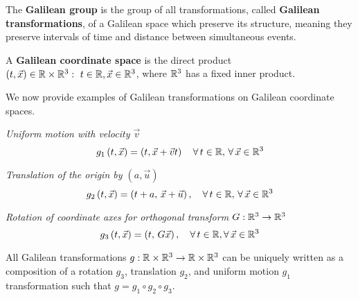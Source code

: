 \documentclass{article}
\begin{document}
		\begin{defn}
			The \textbf{Galilean group} is the group of all transformations, called \textbf{Galilean transformations}, of a Galilean space which preserve its structure, meaning they preserve intervals of time and distance between simultaneous events.
		\end{defn}
		\begin{defn}
			A \textbf{Galilean coordinate space} is the direct product $(t, \vec{x}) \in \mathbb{R} \times \mathbb{R}^3: \,\,t \in \mathbb{R}, \vec{x} \in \mathbb{R}^3$, where $\mathbb{R}^3$ has a fixed inner product.
		\end{defn}
		We now provide examples of Galilean transformations on Galilean coordinate spaces.
		\begin{exmp}
			\textit{Uniform motion with velocity $\vec{v}$}
			$$ g_{1} \left(t, \vec{x}\right) = \left(t, \vec{x} + \vec{v}t \right) \quad \forall \, t \in \mathbb{R}, \, \forall \, \vec{x} \in \mathbb{R}^3$$
		\end{exmp}
		\begin{exmp}
			\textit{Translation of the origin by $(a, \vec{u})$}
			$$ g_2 \left(t, \vec{x}\right) = \left(t+a, \,\vec{x} + \vec{u}\right), \quad \forall \, t \in \mathbb{R}, \, \forall \, \vec{x} \in \mathbb{R}^3$$
		\end{exmp}
		\begin{exmp}
			\textit{Rotation of coordinate axes for orthogonal transform $G: \mathbb{R}^3 \to \mathbb{R}^3$}
			$$ g_3 \left( t, \vec{x} \right) = \left(t,\, G \vec{x} \right), \quad \forall \, t \in \mathbb{R}, \forall \, \vec{x} \in \mathbb{R}^3$$ 
		\end{exmp}
		\begin{thm}
			All Galilean transformations $g: \mathbb{R} \times \mathbb{R}^3 \to \mathbb{R} \times \mathbb{R}^3$ can be uniquely written as a composition of a rotation $g_3$, translation $g_2$, and uniform motion $g_1$ transformation such that $g = g_1 \circ g_2 \circ g_3$.
		\end{thm}
\end{document}
